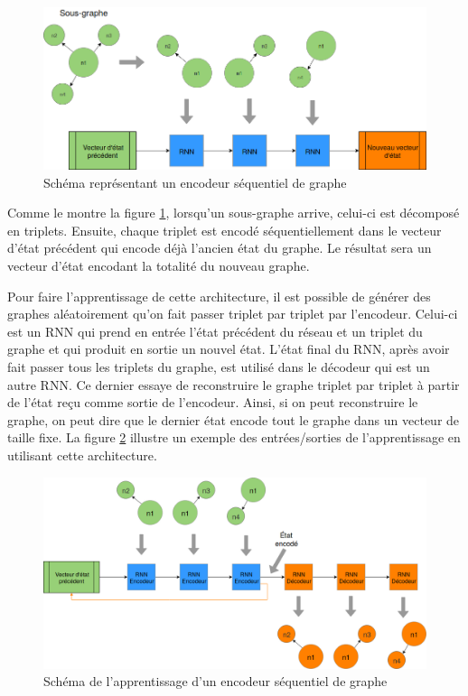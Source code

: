 \begin{figure}[H] 
	\centering
	\includegraphics[width=0.8\linewidth]{images/Conception/DM/encoder_seq.png}
	\caption{Schéma représentant un encodeur séquentiel de graphe}\label{encoder_seq}
	
\end{figure}
Comme le montre la figure \ref{encoder_seq}, lorsqu'un sous-graphe arrive, celui-ci est décomposé en triplets. Ensuite, chaque triplet est encodé séquentiellement dans le vecteur d'état précédent qui encode déjà l'ancien état du graphe. Le résultat sera un vecteur d'état encodant la totalité du nouveau graphe.
\par Pour faire l'apprentissage de cette architecture, il est possible de générer des graphes aléatoirement qu'on fait passer triplet par triplet par l'encodeur. Celui-ci est un RNN qui prend en entrée l'état précédent du réseau et un triplet du graphe et qui produit en sortie un nouvel état. L'état final du RNN, après avoir fait passer tous les triplets du graphe, est utilisé dans le décodeur qui est un autre RNN. Ce dernier essaye de reconstruire le graphe triplet par triplet à partir de l'état reçu comme sortie de l'encodeur. Ainsi, si on peut reconstruire le graphe, on peut dire que le dernier état encode tout le graphe dans un vecteur de taille fixe. La figure \ref{encoder_seq_train} illustre un exemple des entrées/sorties de l'apprentissage en utilisant  cette architecture.
\begin{figure}[H] 
	\centering
	\includegraphics[width=0.9\linewidth]{images/Conception/DM/encoder_seq_train.png}
	\caption{Schéma de l'apprentissage d'un encodeur séquentiel de graphe}\label{encoder_seq_train}
	
\end{figure}
